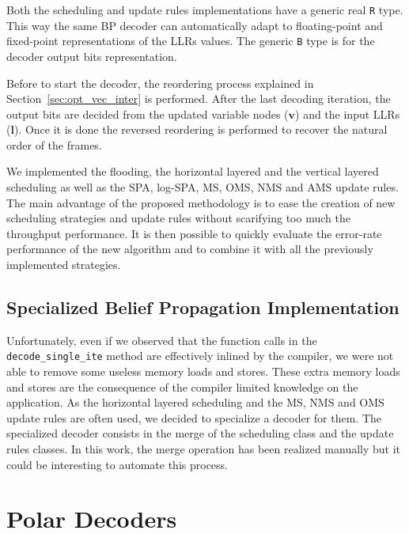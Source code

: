 Both the scheduling and update rules implementations have a generic real
\verb|R| type. This way the same BP decoder can automatically adapt to
floating-point and fixed-point representations of the LLRs values. The generic
\verb|B| type is for the decoder output bits representation.

Before to start the decoder, the reordering process explained in
Section~\ref{sec:opt_vec_inter} is performed. After the last decoding
iteration, the output bits are decided from the updated variable nodes
($\bm{v}$) and the input LLRs ($\bm{l}$). Once it is done the reversed
reordering is performed to recover the natural order of the frames.

We implemented the flooding, the horizontal layered and the vertical layered
scheduling as well as the SPA, log-SPA, MS, OMS, NMS and AMS update rules.
The main advantage of the proposed methodology is to ease the creation of new
scheduling strategies and update rules without scarifying too much the
throughput performance. It is then possible to quickly evaluate the error-rate
performance of the new algorithm and to combine it with all the previously
implemented strategies.

\subsection{Specialized Belief Propagation Implementation}

Unfortunately, even if we observed that the function calls in the
\verb|decode_single_ite| method are effectively inlined by the compiler, we were
not able to remove some useless memory loads and stores. These extra memory
loads and stores are the consequence of the compiler limited knowledge on the
application. As the horizontal layered scheduling and the MS, NMS and OMS update
rules are often used, we decided to specialize a decoder for them. The
specialized decoder consists in the merge of the scheduling class and the update
rules classes. In this work, the merge operation has been realized manually but
it could be interesting to automate this process.

\section{Polar Decoders}
\label{sec:opt_polar}

